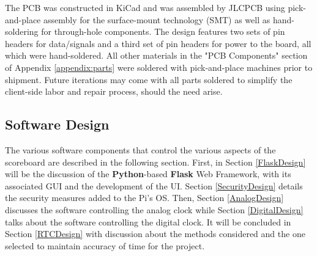 \documentclass[11pt]{article}
\begin{document}
The PCB was constructed in KiCad and was assembled by JLCPCB using pick-and-place assembly for the surface-mount technology (SMT) as well as hand-soldering for through-hole components. 
The design features two sets of pin headers for data/signals and a third set of pin headers for power to the board, all which were hand-soldered. All other materials in the "PCB Components" section of Appendix \ref{appendix:parts} were soldered with pick-and-place machines prior to shipment. Future iterations may come with all parts soldered to simplify the client-side labor and repair process, should the need arise. 






\subsection{Software Design}
\label{SWDesign}

The various software components that control the various aspects of the scoreboard are described in the following section. 
First, in Section \ref{FlaskDesign} will be the discussion of the \textbf{Python}-based \textbf{Flask} Web Framework, with its associated GUI and the development of the UI. 
Section \ref{SecurityDesign} details the security measures added to the Pi's OS. 
Then, Section \ref{AnalogDesign} discusses the software controlling the analog clock while Section \ref{DigitalDesign} talks about the software controlling the digital clock. 
It will be concluded in Section \ref{RTCDesign} with discussion about the methods considered and the one selected to maintain accuracy of time for the project. 
\end{document}
